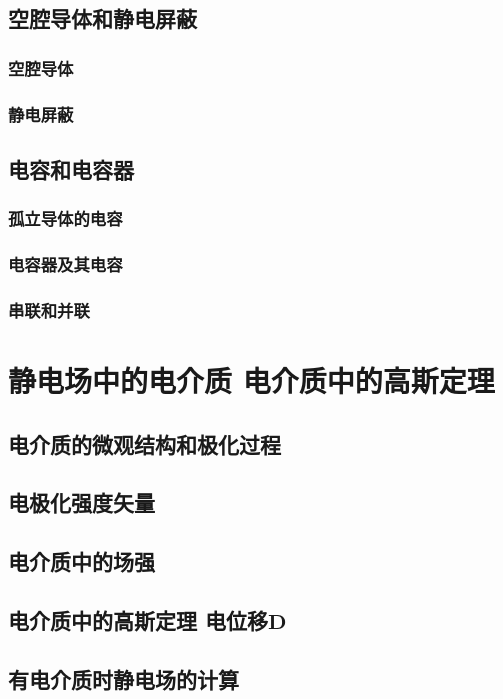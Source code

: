     \subsection{空腔导体和静电屏蔽}
        \subsubsection{空腔导体}
        \subsubsection{静电屏蔽}
    \subsection{电容和电容器}
        \subsubsection{孤立导体的电容}
        \subsubsection{电容器及其电容}
        \subsubsection{串联和并联}

\section{静电场中的电介质 电介质中的高斯定理}
    \subsection{电介质的微观结构和极化过程}
    \subsection{电极化强度矢量}
    \subsection{电介质中的场强}
    \subsection{电介质中的高斯定理 电位移$\boldsymbol{D}$}
    \subsection{有电介质时静电场的计算}

